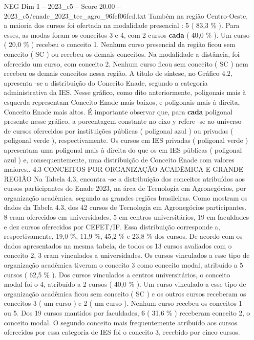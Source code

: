 \begin{textsample}{NEG Dim 1 – 2023\_c5 – Score 20.00 – 2023\_c5/enade\_2023\_tec\_agro\_96fcf06fcd.txt}
Também na região Centro-Oeste, a maioria dos cursos foi ofertada na modalidade presencial : 5 ( 83,3 \% ).
Para esses, as modas foram os conceitos 3 e 4, com 2 cursos \textbf{cada} ( 40,0 \% ).
Um curso ( 20,0 \% ) recebeu o conceito 1.
Nenhum curso presencial da região ficou sem conceito ( SC ) ou recebeu os demais conceitos.
Na modalidade a distância, foi oferecido um curso, com conceito 2.
Nenhum curso ficou sem conceito ( SC ) nem recebeu os demais conceitos nessa região.
A título de síntese, no Gráfico 4.2, apresenta -se a distribuição do Conceito Enade, segundo a categoria administrativa da IES.
Nesse gráfico, como dito anteriormente, poligonais mais à esquerda representam Conceito Enade mais baixos, e poligonais mais à direita, Conceito Enade mais altos.
É importante observar que, para \textbf{cada} poligonal presente nesse gráfico, a porcentagem constante no eixo y refere -se ao universo de cursos oferecidos por instituições públicas ( poligonal azul ) ou privadas ( poligonal verde ), respectivamente.
Os cursos em IES privadas ( poligonal verde ) apresentam uma poligonal mais à direita do que os em IES públicas ( poligonal azul ) e, consequentemente, uma distribuição de Conceito Enade com valores maiores.. 4.3 CONCEITOS POR ORGANIZAÇÃO ACADÊMICA E GRANDE REGIÃO Na Tabela 4.3, encontra -se a distribuição dos conceitos atribuídos aos cursos participantes do Enade 2023, na área de Tecnologia em Agronegócios, por organização acadêmica, segundo as grandes regiões brasileiras.
Como mostram os dados da Tabela 4.3, dos 42 cursos de Tecnologia em Agronegócios participantes, 8 eram oferecidos em universidades, 5 em centros universitários, 19 em faculdades e dez cursos oferecidos por CEFET/IF.
Essa distribuição corresponde a, respectivamente, 19,0 \%, 11,9 \%, 45,2 \% e 23,8 \% dos cursos.
De acordo com os dados apresentados na mesma tabela, de todos os 13 cursos avaliados com o conceito 2, 3 eram vinculados a universidades.
Os cursos vinculados a esse tipo de organização acadêmica tiveram o conceito 3 como conceito modal, atribuído a 5 cursos ( 62,5 \% ).
Dos cursos vinculados a centros universitários, o conceito modal foi o 4, atribuído a 2 cursos ( 40,0 \% ).
Um curso vinculado a esse tipo de organização acadêmica ficou sem conceito ( SC ) e os outros cursos receberam os conceitos 3 ( um curso ) e 2 ( um curso ).
Nenhum curso recebeu os conceitos 1 ou 5.
Dos 19 cursos mantidos por faculdades, 6 ( 31,6 \% ) receberam conceito 2, o conceito modal.
O segundo conceito mais frequentemente atribuído aos cursos oferecidos por essa categoria de IES foi o conceito 3, recebido por cinco cursos.

\end{textsample}
